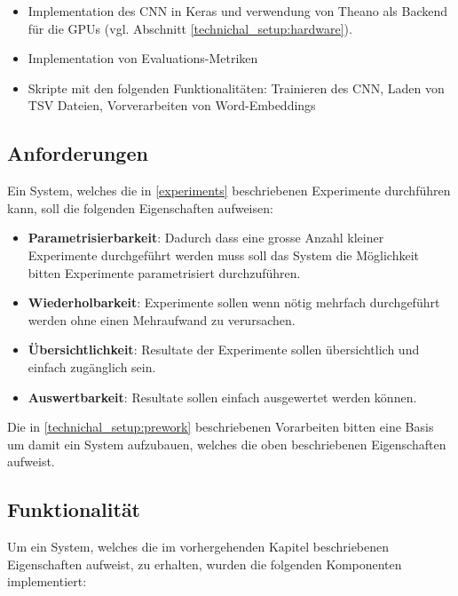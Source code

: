 \begin{itemize}[noitemsep]
	\item Implementation des CNN in Keras und verwendung von Theano \cite{theanoCitShort} als Backend für die \gls{GPU}s (vgl. Abschnitt \ref{technichal_setup:hardware}).
	\item Implementation von Evaluations-Metriken
	\item Skripte mit den folgenden Funktionalitäten: Trainieren des CNN, Laden von TSV Dateien, Vorverarbeiten von Word-Embeddings
\end{itemize}

\subsection{Anforderungen}
\label{technical_setup:requirements}
Ein System, welches die in \ref{experiments} beschriebenen Experimente durchführen kann, soll die folgenden Eigenschaften aufweisen:

\begin{itemize}
	\item \textbf{Parametrisierbarkeit}: Dadurch dass eine grosse Anzahl kleiner Experimente durchgeführt werden muss soll das System die Möglichkeit bitten Experimente parametrisiert durchzuführen.
	\item \textbf{Wiederholbarkeit}: Experimente sollen wenn nötig mehrfach durchgeführt werden ohne einen Mehraufwand zu verursachen. 
	\item \textbf{Übersichtlichkeit}: Resultate der Experimente sollen übersichtlich und einfach zugänglich sein.
	\item \textbf{Auswertbarkeit}: Resultate sollen  einfach ausgewertet werden können.
\end{itemize}

Die in \ref{technichal_setup:prework} beschriebenen Vorarbeiten bitten eine Basis um damit ein System aufzubauen, welches die oben beschriebenen Eigenschaften aufweist.
\subsection{Funktionalität}
\label{technical_setup:functionality}
Um ein System, welches die im vorhergehenden Kapitel beschriebenen Eigenschaften aufweist, zu erhalten, wurden die folgenden Komponenten implementiert:

